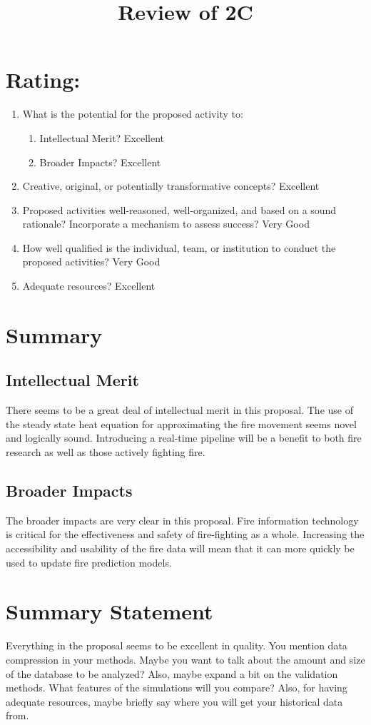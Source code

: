 \documentclass{article}
\title{Review of 2C}
\begin{document}
\maketitle

\section*{Rating:}
\begin{enumerate}
\item What is the potential for the proposed activity to:
  \begin{enumerate}
   \item Intellectual Merit? Excellent
   \item Broader Impacts? Excellent
  \end{enumerate}
\item Creative, original, or potentially transformative concepts? Excellent
\item Proposed activities well-reasoned, well-organized, and based on a sound rationale? Incorporate a mechanism to assess success? Very Good
\item How well qualified is the individual, team, or institution to conduct the proposed activities? Very Good
\item Adequate resources? Excellent
\end{enumerate}

\section*{Summary}
\subsection*{Intellectual Merit}
There seems to be a great deal of intellectual merit in this proposal.  The use of the steady state heat equation for approximating the fire movement seems novel and logically sound.  Introducing a real-time pipeline will be a benefit to both fire research as well as those actively fighting fire.

\subsection*{Broader Impacts}
The broader impacts are very clear in this proposal.  Fire information technology is critical for the effectiveness and safety of fire-fighting as a whole.   Increasing the accessibility and usability of the fire data will mean that it can more quickly be used to update fire prediction models. 

\section*{Summary Statement}
Everything in the proposal seems to be excellent in quality.  You mention data compression in your methods.  Maybe you want to talk about the amount and size of the database to be analyzed?  Also, maybe expand a bit on the validation methods.  What features of the simulations will you compare?  Also, for having adequate resources, maybe briefly say where you will get your historical data from.
\end{document}
